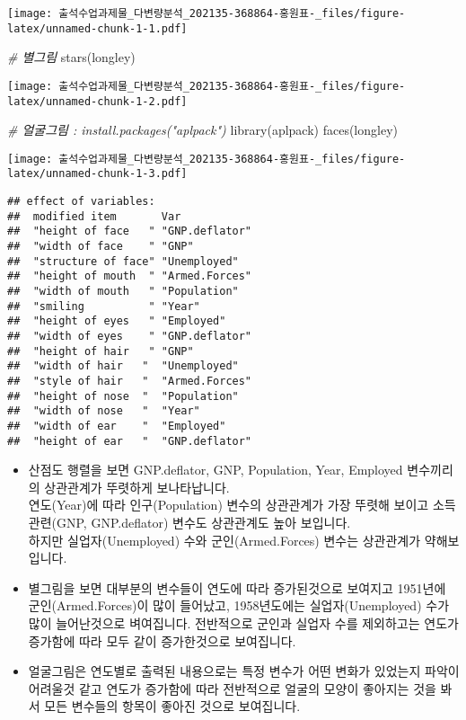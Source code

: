 \documentclass[
]{article}
\newenvironment{Shaded}{\begin{snugshade}}{\end{snugshade}}
\newcommand{\CommentTok}[1]{\textcolor[rgb]{0.56,0.35,0.01}{\textit{#1}}}
\newcommand{\FunctionTok}[1]{\textcolor[rgb]{0.00,0.00,0.00}{#1}}
\newcommand{\NormalTok}[1]{#1}
\begin{document}
\texttt{[image: 출석수업과제물\_다변량분석\_202135-368864-홍원표-\_files/figure-latex/unnamed-chunk-1-1.pdf]}

\begin{Shaded}
\begin{Highlighting}[]
\CommentTok{\# 별그림}
\FunctionTok{stars}\NormalTok{(longley)}
\end{Highlighting}
\end{Shaded}

\texttt{[image: 출석수업과제물\_다변량분석\_202135-368864-홍원표-\_files/figure-latex/unnamed-chunk-1-2.pdf]}

\begin{Shaded}
\begin{Highlighting}[]
\CommentTok{\# 얼굴그림 : install.packages("aplpack")}
\FunctionTok{library}\NormalTok{(aplpack)}
\FunctionTok{faces}\NormalTok{(longley)}
\end{Highlighting}
\end{Shaded}

\texttt{[image: 출석수업과제물\_다변량분석\_202135-368864-홍원표-\_files/figure-latex/unnamed-chunk-1-3.pdf]}

\begin{verbatim}
## effect of variables:
##  modified item       Var           
##  "height of face   " "GNP.deflator"
##  "width of face    " "GNP"         
##  "structure of face" "Unemployed"  
##  "height of mouth  " "Armed.Forces"
##  "width of mouth   " "Population"  
##  "smiling          " "Year"        
##  "height of eyes   " "Employed"    
##  "width of eyes    " "GNP.deflator"
##  "height of hair   " "GNP"         
##  "width of hair   "  "Unemployed"  
##  "style of hair   "  "Armed.Forces"
##  "height of nose  "  "Population"  
##  "width of nose   "  "Year"        
##  "width of ear    "  "Employed"    
##  "height of ear   "  "GNP.deflator"
\end{verbatim}

\begin{itemize}
\item
  산점도 행렬을 보면 GNP.deflator, GNP, Population, Year, Employed
  변수끼리의 상관관계가 뚜렷하게 보나타납니다.\\
  연도(Year)에 따라 인구(Population) 변수의 상관관계가 가장 뚜렷해
  보이고 소득관련(GNP, GNP.deflator) 변수도 상관관계도 높아 보입니다.\\
  하지만 실업자(Unemployed) 수와 군인(Armed.Forces) 변수는 상관관계가
  약해보입니다.
\item
  별그림을 보면 대부분의 변수들이 연도에 따라 증가된것으로 보여지고
  1951년에 군인(Armed.Forces)이 많이 들어났고, 1958년도에는
  실업자(Unemployed) 수가 많이 늘어난것으로 벼여집니다. 전반적으로
  군인과 실업자 수를 제외하고는 연도가 증가함에 따라 모두 같이
  증가한것으로 보여집니다.
\item
  얼굴그림은 연도별로 출력된 내용으로는 특정 변수가 어떤 변화가 있었는지
  파악이 어려울것 같고 연도가 증가함에 따라 전반적으로 얼굴의 모양이
  좋아지는 것을 봐서 모든 변수들의 항목이 좋아진 것으로 보여집니다.
\end{itemize}
\end{document}
